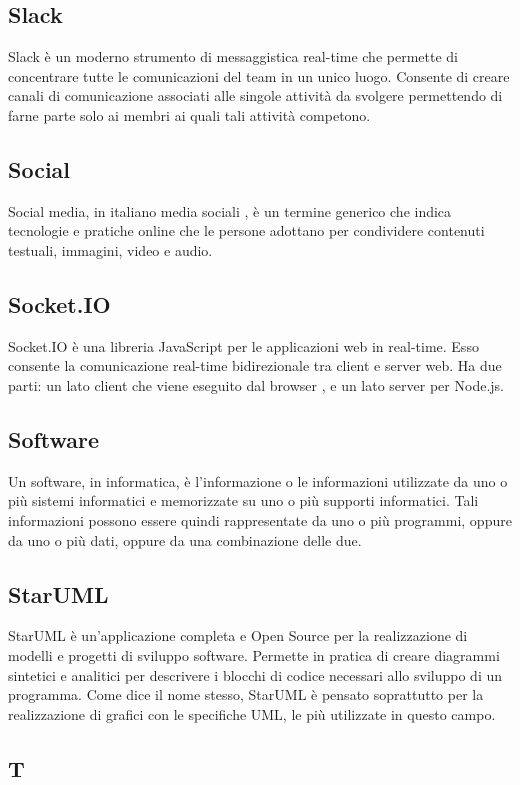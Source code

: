 \subsection{Slack}
Slack è un moderno strumento di messaggistica real-time che permette di concentrare tutte le comunicazioni del team in un unico luogo.
Consente di creare canali di comunicazione associati alle singole attività da svolgere permettendo di farne parte solo ai membri ai quali tali attività competono.

\subsection{Social}
Social media, in italiano media sociali , è un termine generico che indica tecnologie e pratiche online che le persone adottano per condividere contenuti testuali, immagini, video e audio.

\subsection{Socket.IO}
Socket.IO è una libreria JavaScript per le applicazioni web in real-time. Esso consente la comunicazione real-time bidirezionale tra client e server web. Ha due parti: un lato client che viene eseguito dal browser , e un lato server per Node.js.

\subsection{Software}
Un software, in informatica, è l'informazione o le informazioni utilizzate da uno o più
sistemi informatici e memorizzate su uno o più supporti informatici. Tali informazioni possono
essere quindi rappresentate da uno o più programmi, oppure da uno o più dati, oppure
da una combinazione delle due.

\subsection{StarUML}
StarUML è un'applicazione completa e Open Source per la realizzazione di modelli e progetti di sviluppo software. Permette in pratica di creare diagrammi sintetici e analitici per descrivere i blocchi di codice necessari allo sviluppo di un programma. Come dice il nome stesso, StarUML è pensato soprattutto per la realizzazione di grafici con le specifiche UML, le più utilizzate in questo campo.

\newpage

\begin{center}
\Huge\section{\uppercase{T}}
\end{center}

